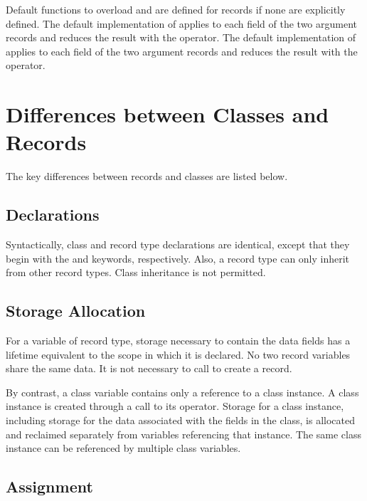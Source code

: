 Default functions to overload \chpl{==} and \chpl{\!=} are defined for
records if none are explicitly defined.
The default implementation of \chpl{==} applies \chpl{==} to each
field of the two argument records and reduces the result with
the \chpl{&&} operator.  The default implementation of \chpl{\!=}
applies \chpl{\!=} to each field of the two argument records and
reduces the result with the \chpl{||} operator.

\section{Differences between Classes and Records}
\label{Class_and_Record_Differences}

The key differences between records and classes are listed below.

\subsection{Declarations}
\label{Declaration_Differences}

Syntactically, class and record type declarations are identical, except that
they begin with the  and  keywords, respectively.
Also, a record type can only inherit from other record types.  Class inheritance
is not permitted.

\subsection{Storage Allocation}
\label{Storage_Allocation_Differences}

For a variable of record type, storage necessary to contain the data fields
has a lifetime equivalent to the scope in which it is declared.  No two record
variables share the same data.  It is not necessary to call  to create
a record.

By contrast, a class variable contains only a reference to a
class instance.  A class instance is created through a call to its 
operator.  Storage for a class instance, including storage for
the data associated with the fields in the class, is allocated and reclaimed
separately from variables referencing that instance.  The same class instance
can be referenced by multiple class variables.

\subsection{Assignment}
\label{Assignment_Differences}

